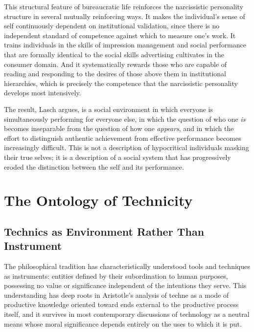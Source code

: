 \documentclass[12pt]{memoir}
\begin{document}
This structural feature of bureaucratic life reinforces the narcissistic personality structure
in several mutually reinforcing ways. It makes the individual's sense of self continuously
dependent on institutional validation, since there is no independent standard of competence
against which to measure one's work. It trains individuals in the skills of impression
management and social performance that are formally identical to the social skills advertising
cultivates in the consumer domain. And it systematically rewards those who are capable of
reading and responding to the desires of those above them in institutional hierarchies, which
is precisely the competence that the narcissistic personality develops most intensively.

The result, Lasch argues, is a social environment in which everyone is simultaneously performing
for everyone else, in which the question of who one \textit{is} becomes inseparable from the
question of how one \textit{appears}, and in which the effort to distinguish authentic
achievement from effective performance becomes increasingly difficult. This is not a description
of hypocritical individuals masking their true selves; it is a description of a social system
that has progressively eroded the distinction between the self and its performance.

\section{The Ontology of Technicity}
\label{sec:technicity}

\subsection{Technics as Environment Rather Than Instrument}

The philosophical tradition has characteristically understood tools and techniques as
instruments: entities defined by their subordination to human purposes, possessing no
value or significance independent of the intentions they serve. This understanding has
deep roots in Aristotle's analysis of techne as a mode of productive knowledge oriented
toward ends external to the productive process itself, and it survives in most
contemporary discussions of technology as a neutral means whose moral significance
depends entirely on the uses to which it is put.
\end{document}
